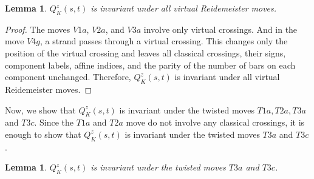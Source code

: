 \documentclass[10pt,a4paper,reqno]{amsart}
\newtheorem{lemma}[theorem]{Lemma}
\theoremstyle{definition}
\theoremstyle{remark}
\begin{document}
\begin{lemma}\label{lem:vinv}
	$Q^{z}_{K}(s,t)$ is invariant under all virtual Reidemeister moves.
\end{lemma}
\begin{proof}
		The moves $V1a$, $V2a$, and $V3a$ involve only virtual crossings. And in the move $V4g$, a strand passes through a virtual crossing. This changes only the position of the virtual crossing and leaves all classical crossings, their signs, component labels, affine indices, and the parity of the number of bars on each component unchanged. Therefore, $Q^{z}_{K}(s,t)$ is invariant under all virtual Reidemeister moves.
\end{proof}
Now, we show that $Q^{z}_{K}(s,t)$ is invariant under the twisted moves $T1a, T2a, T3a$ and $T3c$. Since  the $T1a$ and $T2a$ move do not involve any classical crossings, it is enough to show that $Q^{z}_{K}(s,t)$ is invariant under the twisted moves $T3a$ and $T3c$.
\begin{lemma}\label{lem:t3inv}
	$Q^{z}_{K}(s,t)$ is invariant under the twisted moves $T3a$ and $T3c$.
\end{lemma}
\end{document}
